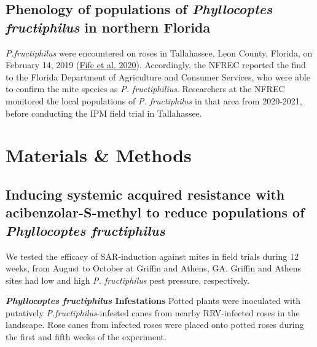 \documentclass{ufdissertation}[overrideChapters] %
\begin{document}
{\hypertarget{phenology-of-populations-of-phyllocoptes-fructiphilus-in-northern-florida}{%
\subsection{\texorpdfstring{Phenology of populations of \emph{Phyllocoptes fructiphilus} in northern Florida}{Phenology of populations of Phyllocoptes fructiphilus in northern Florida}}\label{phenology-of-populations-of-phyllocoptes-fructiphilus-in-northern-florida}}

\emph{P.fructiphilus} were encountered on roses in Tallahassee, Leon County, Florida, on February 14, 2019 (\protect\hyperlink{ref-Fife2020}{Fife et al. 2020}). Accordingly, the NFREC reported the find to the Florida Department of Agriculture and Consumer Services, who were able to confirm the mite species as \emph{P. fructiphilius}. Researchers at the NFREC monitored the local populations of \emph{P. fructiphilus} in that area from 2020-2021, before conducting the IPM field trial in Tallahassee.

\hypertarget{materials-methods-2}{%
\section{Materials \& Methods}\label{materials-methods-2}}

\hypertarget{inducing-systemic-acquired-resistance-with-acibenzolar-s-methyl-to-reduce-populations-of-phyllocoptes-fructiphilus}{%
\subsection{\texorpdfstring{Inducing systemic acquired resistance with acibenzolar-S-methyl to reduce populations of \emph{Phyllocoptes fructiphilus}}{Inducing systemic acquired resistance with acibenzolar-S-methyl to reduce populations of Phyllocoptes fructiphilus}}\label{inducing-systemic-acquired-resistance-with-acibenzolar-s-methyl-to-reduce-populations-of-phyllocoptes-fructiphilus}}

We tested the efficacy of SAR-induction against mites in field trials during 12 weeks, from August to October at Griffin and Athens, GA. Griffin and Athens sites had low and high \emph{P. fructiphilus} pest pressure, respectively.

\textbf{\emph{Phyllocoptes fructiphilus} Infestations}
Potted plants were inoculated with putatively \emph{P.fructiphilus}-infested canes from nearby RRV-infected roses in the landscape. Rose canes from infected roses were placed onto potted roses during the first and fifth weeks of the experiment.

}
\end{document}
